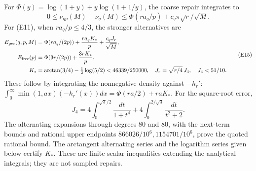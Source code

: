 \documentclass[11pt]{article}
\theoremstyle{definition}\newtheorem{definition}[theorem]{Definition}
\theoremstyle{remark}\newtheorem{remark}[theorem]{Remark}
\begin{document}
For \(\Phi(y)=\log(1+y)+y\log(1+1/y)\), the coarse repair integrates
to
\[
 0\le\nu_{qp}(M)-\nu_q(M)
 \le\Phi(ra_q/p)+c_q\pi\sqrt r/\sqrt M .                            \tag{E14}
\]
For (E11), when \(ra_q/p\le4/3\), the stronger alternatives are
\[
\begin{split}
 E_{\rm per}(q,p,M)&=
 \Phi(ra_q/(2p))+\frac{ra_qK_*}{p}+\frac{c_qJ_r}{\sqrt M},\\
 E_{\rm free}(p)&=
 \Phi(3r/(2p))+\frac{3rK_*}{p},\\
 K_*&=\arctan(3/4)-\tfrac12\log(5/2)<46339/250000,\quad
 J_r=\sqrt{r/4}\,J_4,\quad J_4<51/10.
\end{split}                                                        \tag{E15}
\]
These follow by integrating the nonnegative density against \(-h_r'\):
\(\int_0^\infty\min(1,ax)(-h_r'(x))dx=
\Phi(ra/2)+raK_*\).
For the square-root error,
\[
 J_4=4\int_0^{\sqrt3/2}\frac{dt}{1+t^4}
       +4\int_0^{2/\sqrt3}\frac{dt}{t^2+2}.
\]
The alternating expansions through degrees \(80\) and \(80\),
with the next-term bounds and rational upper endpoints
\(866026/10^6,1154701/10^6\), prove the quoted rational bound.
The arctangent alternating series and the logarithm series given below
certify \(K_*\). These are finite scalar inequalities extending the
analytical integrals; they are not sampled repairs.
\end{document}
